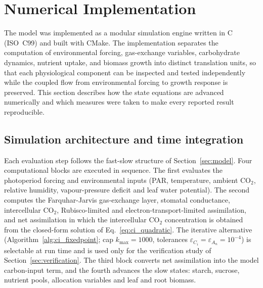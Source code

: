\documentclass[a4paper,fleqn]{cas-sc}
\begin{document}
\section{Numerical Implementation}
\label{sec:implementation}

The model was implemented as a modular simulation engine written in C
(ISO~C99) and built with CMake. The implementation separates the computation
of environmental forcing, gas-exchange variables, carbohydrate dynamics,
nutrient uptake, and biomass growth into distinct translation units, so that
each physiological component can be inspected and tested independently while
the coupled flow from environmental forcing to growth response is preserved.
This section describes how the state equations are advanced numerically and
which measures were taken to make every reported result reproducible.

\subsection{Simulation architecture and time integration}

Each evaluation step follows the fast-slow structure of
Section~\ref{sec:model}. Four computational blocks are executed in sequence.
The first evaluates the photoperiod forcing and environmental inputs (PAR,
temperature, ambient CO$_2$, relative humidity, vapour-pressure deficit and
leaf water potential). The second computes the Farquhar-Jarvis gas-exchange
layer, stomatal conductance, intercellular CO$_2$, Rubisco-limited and
electron-transport-limited assimilation, and net assimilation in which the
intercellular CO$_2$ concentration is obtained from the closed-form
solution of Eq.~\eqref{eq:ci_quadratic}. The iterative alternative
(Algorithm~\ref{alg:ci_fixedpoint}; cap $k_{\max}=1000$, tolerances
$\varepsilon_{C_i}=\varepsilon_{A_n}=10^{-4}$) is selectable at run time and
is used only for the verification study of
Section~\ref{sec:verification}. The third block converts net assimilation
into the model carbon-input term, and the fourth advances the slow states:
starch, sucrose, nutrient pools, allocation variables and leaf and root
biomass.
\end{document}
